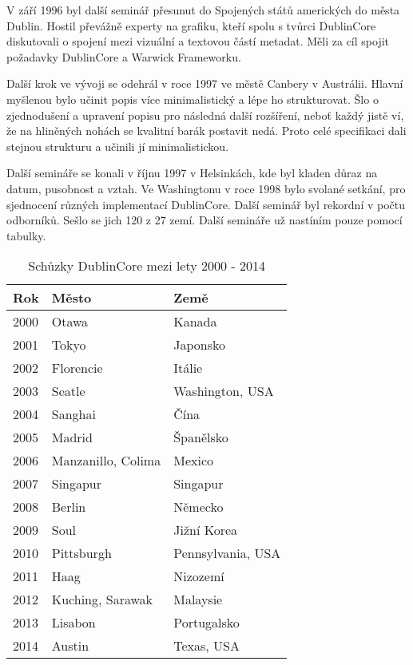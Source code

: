 \par V září 1996 byl další seminář přesunut do Spojených států amerických do města Dublin. Hostil převážně experty na grafiku, kteří spolu s tvůrci DublinCore diskutovali o spojení mezi vizuální a textovou částí metadat. Měli za cíl spojit požadavky DublinCore a Warwick Frameworku.

\par Další krok ve vývoji se odehrál v roce 1997 ve městě Canbery v Austrálii. Hlavní myšlenou bylo učinit popis více minimalistický a lépe ho strukturovat. Šlo o zjednodušení a upravení popisu pro následná další rozšíření, neboť každý jistě ví, že na hliněných nohách se kvalitní barák postavit nedá. Proto celé specifikaci dali stejnou strukturu a učinili jí minimalistickou.

\par Další semináře se konali v říjnu 1997 v Helsinkách, kde byl kladen důraz na datum, pusobnost a vztah. Ve Washingtonu v roce 1998 bylo svolané setkání, pro sjednocení různých implementací DublinCore. Další seminář byl rekordní v počtu odborníků. Sešlo se jich 120 z 27 zemí. Další semináře už nastíním pouze pomocí tabulky.

\begin{table}[h!]
\centering
\caption[DublinCore historie]{Schůzky DublinCore mezi lety 2000 - 2014}\label{tab:dublincore}
\begin{tabular}{| l | l | l |}
\hline
Rok & Město & Země\\
\hline
2000 & Otawa & Kanada\\
\hline
2001 & Tokyo & Japonsko\\
\hline
2002 & Florencie & Itálie\\
\hline
2003 & Seatle & Washington, USA\\
\hline
2004 & Sanghai & Čína\\
\hline
2005 & Madrid & Španělsko\\
\hline
2006 & Manzanillo, Colima & Mexico\\
\hline
2007 & Singapur & Singapur\\
\hline
2008 & Berlin & Německo\\
\hline
2009 & Soul & Jižní Korea\\
\hline
2010 & Pittsburgh & Pennsylvania, USA\\
\hline
2011 & Haag & Nizozemí\\
\hline
2012 & Kuching, Sarawak & Malaysie\\
\hline
2013 & Lisabon & Portugalsko\\
\hline
2014 & Austin & Texas, USA\\
\hline
\end{tabular}
\end{table}

